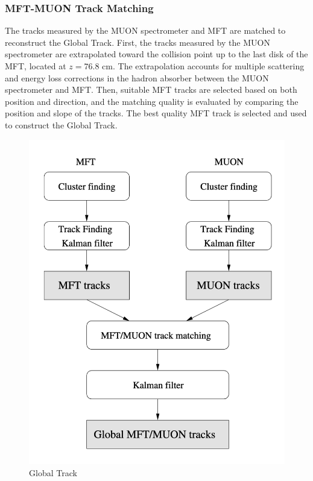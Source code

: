         \subsubsection{MFT-MUON Track Matching}\label{MFT-MUON_matching}
            The tracks measured by the MUON spectrometer and MFT are matched to reconstruct the Global Track. First, the tracks measured by the MUON spectrometer are extrapolated toward the collision point up to the last disk of the MFT, located at $z=76.8$ cm. The extrapolation accounts for multiple scattering and energy loss corrections in the hadron absorber between the MUON spectrometer and MFT. Then, suitable MFT tracks are selected based on both position and direction, and the matching quality is evaluated by comparing the position and slope of the tracks. The best quality MFT track is selected and used to construct the Global Track.
            \begin{figure}[htbp]
                \centering
                \includegraphics[keepaspectratio, scale=0.3]{fig/2_2_3_GlobalTrackReco.png}
                \caption{Global Track\cite{MFT_TDR}}
                \label{GlobalTrackReco}
            \end{figure}